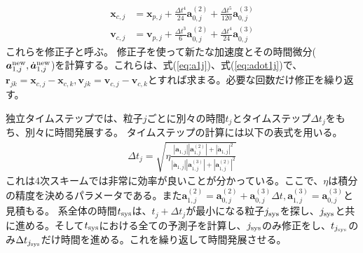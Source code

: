 \documentclass[a4paper,10pt,oneside,twocolumn,notitlepage,final]{jarticle}
\begin{document}
\begin{align}
{\bm x}_{c,j} &= {\bm x}_{p,j} + \frac{\Delta t ^4}{24} {\bm a}_{0,j}^{(2)} + \frac{\Delta t ^5}{120} {\bm a}_{0,j}^{(3)}\\
{\bm v}_{c,j} &= {\bm v}_{p,j} + \frac{\Delta t ^3}{6} {\bm a}_{0,j}^{(2)} + \frac{\Delta t ^4}{24} {\bm a}_{0,j}^{(3)}
\end{align}
これらを修正子と呼ぶ。
修正子を使って新たな加速度とその時間微分(${\bm a}_{1,j}^{\rm new},\dot{{\bm a}}_{1,j}^{\rm new}$)を計算する。これらは、式(\ref{eq:a1j})、式(\ref{eq:adot1j})で、${\bm r}_{jk} = {\bm x}_{c,j} - {\bm x}_{c,k},{\bm v}_{jk} = {\bm v}_{c,j} - {\bm v}_{c,k}$とすれば求まる。必要な回数だけ修正を繰り返す。

独立タイムステップでは、粒子$j$ごとに別々の時間$t_j$とタイムステップ$\Delta t_j$をもち、別々に時間発展する。
タイムステップの計算には以下の表式を用いる\citep{Aarseth1985}。
\begin{align}
\Delta t_j = \sqrt{\eta \frac{| {\bm a}_{1,j}| | {\bm a}_{1,j}^{(2)} | + | \dot{{\bm a}}_{1,j}| ^2}{| \dot{{\bm a}}_{1,j}| | {\bm a}_{1,j}^{(3)} | + | {\bm a}_{1,j}^{(2)} | ^2}}
\end{align}
これは4次スキームでは非常に効率が良いことが分かっている\citep{Makino1991}。ここで、$\eta$は積分の精度を決めるパラメータである。また${\bm a}_{1,j}^{(2)} = {\bm a}_{0,j}^{(2)} + {\bm a}_{0,j}^{(3)} \Delta t, {\bm a}_{1,j}^{(3)} = {\bm a}_{0,j}^{(3)}$と見積もる。
系全体の時間$t_{\rm sys}$は、$t_j + \Delta t_j$が最小になる粒子$j_{\rm sys}$を探し、$j_{\rm sys}$と共に進める。そして$t_{\rm sys}$における全ての予測子を計算し、$j_{\rm sys}$のみ修正をし、$t_{j_{\rm sys}}$のみ$\Delta t_{j_{\rm sys}}$だけ時間を進める。これを繰り返して時間発展させる。
\end{document}
